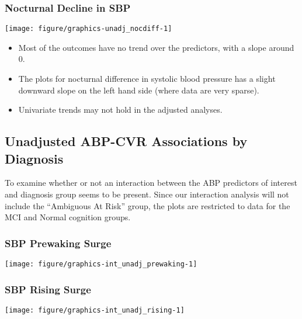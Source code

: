 \documentclass[10pt]{article}\usepackage[]{graphicx}\usepackage[]{color}
\makeatletter
\def\maxwidth{ %
  \ifdim\Gin@nat@width>\linewidth
    \linewidth
  \else
    \Gin@nat@width
  \fi
}
\newenvironment{knitrout}{}{} %
\makeatother
\begin{document}
\subsubsection{Nocturnal Decline in SBP}
\begin{knitrout}
\color{fgcolor}

{\centering \texttt{[image: figure/graphics-unadj\_nocdiff-1]} 

}



\end{knitrout}

\begin{itemize}
  \item Most of the outcomes have no trend over the predictors, with a slope around 0.
  \item The plots for nocturnal difference in systolic blood pressure has a slight downward slope on the left hand side (where data are very sparse). 
  \item Univariate trends may not hold in the adjusted analyses.
\end{itemize}

\subsection{Unadjusted ABP-CVR Associations by Diagnosis}

To examine whether or not an interaction between the ABP predictors of interest and diagnosis group seems to be present. Since our interaction analysis will not include the ``Ambiguous At Risk'' group, the plots are restricted to data for the MCI and Normal cognition groups.

\subsubsection{SBP Prewaking Surge}
\begin{knitrout}
\color{fgcolor}

{\centering \texttt{[image: figure/graphics-int\_unadj\_prewaking-1]} 

}



\end{knitrout}
\clearpage
\subsubsection{SBP Rising Surge}
\begin{knitrout}
\color{fgcolor}

{\centering \texttt{[image: figure/graphics-int\_unadj\_rising-1]} 

}



\end{knitrout}
\clearpage
\end{document}
